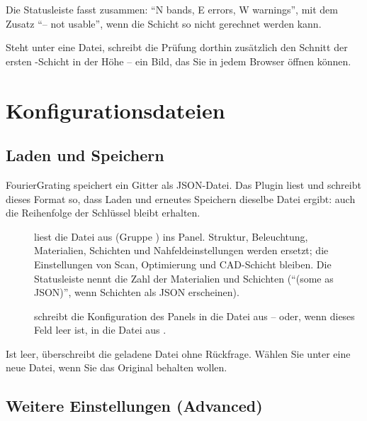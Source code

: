 Die Statusleiste fasst zusammen: \enquote{N bands, E errors, W warnings}, mit dem Zusatz
\enquote{– not usable}, wenn die Schicht so nicht gerechnet werden kann.

Steht unter  eine Datei, schreibt die Prüfung dorthin zusätzlich den Schnitt der
ersten -Schicht in der Höhe  -- ein Bild, das Sie in jedem Browser
öffnen können.

\section{Konfigurationsdateien}\label{sec:fg-dateien}

\subsection{Laden und Speichern}

FourierGrating speichert ein Gitter als JSON-Datei. Das Plugin liest und schreibt dieses Format so,
dass Laden und erneutes Speichern dieselbe Datei ergibt: auch die Reihenfolge der Schlüssel bleibt
erhalten.

\begin{description}
  \item[] liest die Datei aus  (Gruppe ) ins
    Panel. Struktur, Beleuchtung, Materialien, Schichten und Nahfeldeinstellungen werden ersetzt;
    die Einstellungen von Scan, Optimierung und CAD-Schicht bleiben. Die Statusleiste nennt die
    Zahl der Materialien und Schichten (\enquote{(some as JSON)}, wenn Schichten als JSON
    erscheinen).
  \item[] schreibt die Konfiguration des Panels in die Datei aus
     -- oder, wenn dieses Feld leer ist, in die Datei aus .
\end{description}

\begin{warnung}
Ist  leer, überschreibt  die geladene Datei ohne Rückfrage.
Wählen Sie unter  eine neue Datei, wenn Sie das Original behalten wollen.
\end{warnung}

\subsection{Weitere Einstellungen (Advanced)}\label{sec:fg-advanced}

